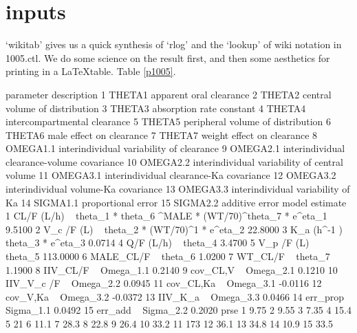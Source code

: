 \section{inputs}
`wikitab' gives us a quick synthesis of `rlog' and the `lookup' of wiki notation in 1005.ctl.
We do some science on the result first, and then some aesthetics for printing in a \LaTeX table.  Table \ref{p1005}.
\begin{Schunk}
\begin{Soutput}
   parameter                                   description
1     THETA1                       apparent oral clearance
2     THETA2                central volume of distribution
3     THETA3                      absorption rate constant
4     THETA4                  intercompartmental clearance
5     THETA5             peripheral volume of distribution
6     THETA6                      male effect on clearance
7     THETA7                    weight effect on clearance
8   OMEGA1.1      interindividual variability of clearance
9   OMEGA2.1   interindividual clearance-volume covariance
10  OMEGA2.2 interindividual variability of central volume
11  OMEGA3.1       interindividual clearance-Ka covariance
12  OMEGA3.2          interindividual volume-Ka covariance
13  OMEGA3.3             interindividual variability of Ka
14  SIGMA1.1                            proportional error
15  SIGMA2.2                                additive error
                                                                model estimate
1  CL/F (L/h) ~ theta_1 *  theta_6 ^MALE * (WT/70)^theta_7  * e^eta_1   9.5100
2                          V_c /F (L) ~ theta_2 * (WT/70)^1 * e^eta_2  22.8000
3                                     K_a (h^-1 ) ~ theta_3 * e^eta_3   0.0714
4                                                 Q/F (L/h) ~ theta_4   3.4700
5                                                V_p /F (L) ~ theta_5 113.0000
6                                                 MALE_CL/F ~ theta_6   1.0200
7                                                   WT_CL/F ~ theta_7   1.1900
8                                                IIV_CL/F ~ Omega_1.1   0.2140
9                                                cov_CL,V ~ Omega_2.1   0.1210
10                                             IIV_V_c /F ~ Omega_2.2   0.0945
11                                             cov_CL,Ka  ~ Omega_3.1  -0.0116
12                                              cov_V,Ka  ~ Omega_3.2  -0.0372
13                                               IIV_K_a  ~ Omega_3.3   0.0466
14                                               err_prop ~ Sigma_1.1   0.0492
15                                                err_add ~ Sigma_2.2   0.2020
   prse
1  9.75
2  9.55
3  7.35
4  15.4
5    21
6  11.1
7  28.3
8  22.8
9  26.4
10 33.2
11  173
12 36.1
13 34.8
14 10.9
15 33.5
\end{Soutput}
\end{Schunk}
